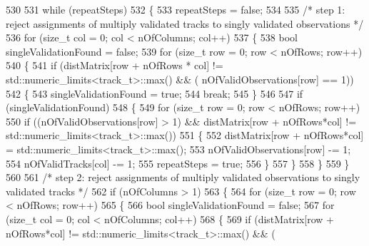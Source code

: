 \begin{DoxyCode}
530 
531         \textcolor{keywordflow}{while} (repeatSteps)
532         \{
533             repeatSteps = \textcolor{keyword}{false};
534 
535             \textcolor{comment}{/* step 1: reject assignments of multiply validated tracks to singly validated observations     
       */}
536             \textcolor{keywordflow}{for} (\textcolor{keywordtype}{size\_t} col = 0; col < nOfColumns; col++)
537             \{
538                 \textcolor{keywordtype}{bool} singleValidationFound = \textcolor{keyword}{false};
539                 \textcolor{keywordflow}{for} (\textcolor{keywordtype}{size\_t} row = 0; row < nOfRows; row++)
540                 \{
541                     \textcolor{keywordflow}{if} (distMatrix[row + nOfRows * col] != std::numeric\_limits<track\_t>::max() && (
      nOfValidObservations[row] == 1))
542                     \{
543                         singleValidationFound = \textcolor{keyword}{true};
544                         \textcolor{keywordflow}{break};
545                     \}
546 
547                     \textcolor{keywordflow}{if} (singleValidationFound)
548                     \{
549                         \textcolor{keywordflow}{for} (\textcolor{keywordtype}{size\_t} row = 0; row < nOfRows; row++)
550                             \textcolor{keywordflow}{if} ((nOfValidObservations[row] > 1) && distMatrix[row + nOfRows*col] != 
      std::numeric\_limits<track\_t>::max())
551                             \{
552                                 distMatrix[row + nOfRows*col] = std::numeric\_limits<track\_t>::max();
553                                 nOfValidObservations[row] -= 1;
554                                 nOfValidTracks[col] -= 1;
555                                 repeatSteps = \textcolor{keyword}{true};
556                             \}
557                     \}
558                 \}
559             \}
560 
561             \textcolor{comment}{/* step 2: reject assignments of multiply validated observations to singly validated tracks */}
562             \textcolor{keywordflow}{if} (nOfColumns > 1)
563             \{
564                 \textcolor{keywordflow}{for} (\textcolor{keywordtype}{size\_t} row = 0; row < nOfRows; row++)
565                 \{
566                     \textcolor{keywordtype}{bool} singleValidationFound = \textcolor{keyword}{false};
567                     \textcolor{keywordflow}{for} (\textcolor{keywordtype}{size\_t} col = 0; col < nOfColumns; col++)
568                     \{
569                         \textcolor{keywordflow}{if} (distMatrix[row + nOfRows*col] != std::numeric\_limits<track\_t>::max() && (

\end{DoxyCode}
